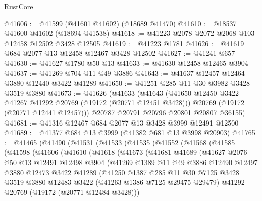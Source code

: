 \begin{lexlean}{RustCore}
\begin{coremodule}
@41606 := @41599 (@41601 @41602) (@18689 @41470)
@41610 := @18537 @41600 @41602 (@18694 @41538)
@41618 := @41223 @2078 @2072 @2068 @103 @12458 @12502 @3428 @12505
@41619 := @41223 @1781
@41626 := @41619 @684 @2077 @13 @12458 @12467 @3428 @12502
@41627 := @41241 @657
@41630 := @41627 @1780 @50 @13
@41633 := @41630 @12458 @12465 @3904
@41637 := @41269 @704 @11 @49 @3886
@41643 := @41637 @12457 @12464 @3880 @12440 @3422 @41289
@41650 := @41251 @285 @11 @30 @3982 @3428 @3519 @3880
@41673 := @41626
    (@41633
      (@41643
        (@41650 @12450 @3422 @41267 @41292 @20769 (@19172 (@20771 @12451 @3428)))
        @20769
        (@19172 (@20771 @12441 @12457)))
      @20787
      @20791
      @20796
      @20801
      @20807
      @36155)
@41681 := @41316 @12467 @684 @2077 @13 @3428 @3999 @12491 @12500
@41689 := @41377 @684 @13 @3999 (@41382 @681 @13 @3998 @20903)
@41765 := @41465
    (@41490
      (@41531
        (@41533
          (@41535
            (@41552
              (@41568
                (@41585
                  (@41598
                    (@41606
                      (@41610
                        (@41618
                          (@41673
                            (@41681
                              @41689
                              (@41627
                                @2076
                                @50
                                @13
                                @12491
                                @12498
                                @3904
                                (@41269
                                  @1389
                                  @11
                                  @49
                                  @3886
                                  @12490
                                  @12497
                                  @3880
                                  @12473
                                  @3422
                                  @41289
                                  (@41250
                                    @1387
                                    @285
                                    @11
                                    @30
                                    @7125
                                    @3428
                                    @3519
                                    @3880
                                    @12483
                                    @3422
                                    (@41263 @1386 @7125 @29475 @29479)
                                    @41292
                                    @20769
                                    (@19172 (@20771 @12484 @3428)))

\end{coremodule}
\end{lexlean}

